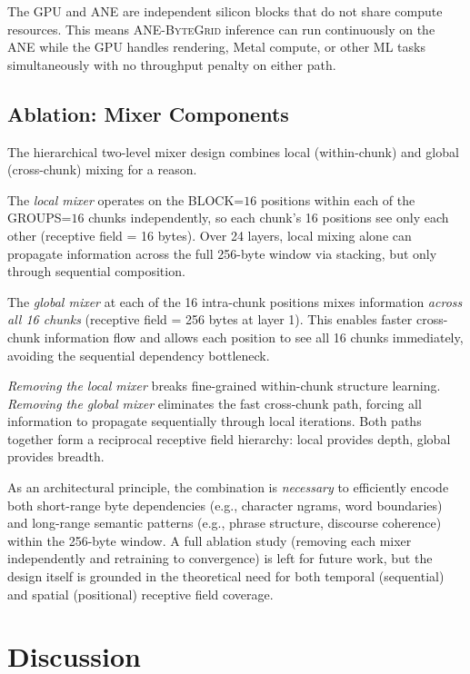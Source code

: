 \documentclass[10pt,twocolumn]{article}
\newcommand{\bytegrid}{\textsc{ANE-ByteGrid}}
\begin{document}
The GPU and ANE are independent silicon blocks that do not share
compute resources.
This means \bytegrid{} inference can run continuously on the ANE
while the GPU handles rendering, Metal compute, or other ML tasks
simultaneously with no throughput penalty on either path.

\subsection{Ablation: Mixer Components}

The hierarchical two-level mixer design combines local (within-chunk) and global
(cross-chunk) mixing for a reason. 

The \emph{local mixer} operates on the BLOCK=$16$ positions within each of the
GROUPS=$16$ chunks independently, so each chunk's 16 positions see only each
other (receptive field = 16 bytes). Over 24 layers, local mixing alone can
propagate information across the full 256-byte window via stacking, but only
through sequential composition.

The \emph{global mixer} at each of the 16 intra-chunk positions mixes information
\emph{across all 16 chunks} (receptive field = 256 bytes at layer 1). This
enables faster cross-chunk information flow and allows each position to see
all 16 chunks immediately, avoiding the sequential dependency bottleneck.

\emph{Removing the local mixer} breaks fine-grained within-chunk structure learning.
\emph{Removing the global mixer} eliminates the fast cross-chunk path, forcing all
information to propagate sequentially through local iterations. Both paths together
form a reciprocal receptive field hierarchy: local provides depth, global provides breadth.

As an architectural principle, the combination is \emph{necessary} to efficiently
encode both short-range byte dependencies (e.g., character ngrams, word boundaries)
and long-range semantic patterns (e.g., phrase structure, discourse coherence)
within the 256-byte window. A full ablation study (removing each mixer independently
and retraining to convergence) is left for future work, but the design itself
is grounded in the theoretical need for both temporal (sequential) and spatial
(positional) receptive field coverage.

\section{Discussion}
\label{sec:discussion}
\end{document}
